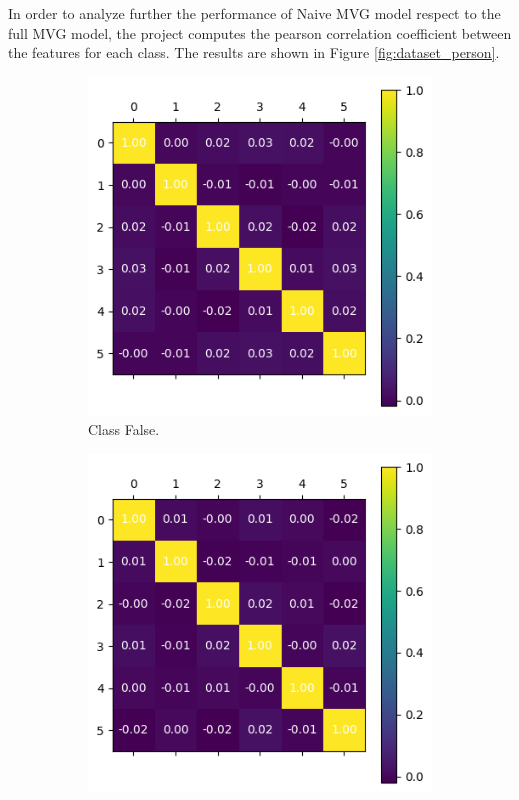 \documentclass{article}
\begin{document}
In order to analyze further the performance of Naive MVG model respect to the full MVG model, the project computes the pearson correlation coefficient between the features for each class. The results are shown in Figure \ref{fig:dataset_person}. 
\begin{figure}[ht]
    \centering
    \begin{subfigure}[b]{0.45\textwidth}
        \centering
        \includegraphics[width=\textwidth]{images/dataset_pearson_false.png}
        \caption{Class False.}
    \end{subfigure}
    \hfill
    \begin{subfigure}[b]{0.45\textwidth}
        \centering
        \includegraphics[width=\textwidth]{images/dataset_pearson_true.png}

\end{subfigure}
\end{figure}
\end{document}
